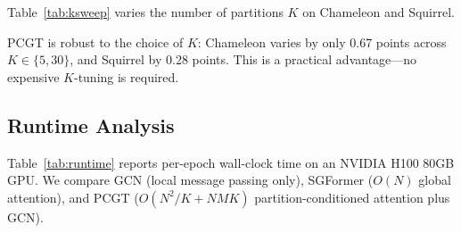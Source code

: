 Table~\ref{tab:ksweep} varies the number of partitions $K$ on Chameleon and Squirrel.

\begin{table}[t]
\centering
{}
\caption{Effect of partition count $K$. Default $K$=10. Performance is stable across $K \in \{5, 30\}$.}
\label{tab:ksweep}
\end{table}

\noindent PCGT is robust to the choice of $K$: Chameleon varies by only 0.67 points across $K \in \{5, 30\}$, and Squirrel by 0.28 points. This is a practical advantage---no expensive $K$-tuning is required.

\subsection{Runtime Analysis}

Table~\ref{tab:runtime} reports per-epoch wall-clock time on an NVIDIA H100 80GB GPU. We compare GCN (local message passing only), SGFormer ($O(N)$ global attention), and PCGT ($O(N^2/K + NMK)$ partition-conditioned attention plus GCN).

